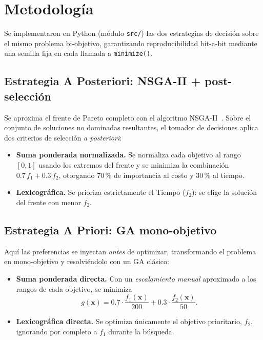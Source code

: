 \section{Metodología}

Se implementaron en Python (módulo \texttt{src/}) las dos estrategias de
decisión sobre el mismo problema bi-objetivo, garantizando reproducibilidad
bit-a-bit mediante una semilla fija en cada llamada a \texttt{minimize()}.

\subsection{Estrategia A Posteriori: NSGA-II + post-selección}

Se aproxima el frente de Pareto completo con el algoritmo
NSGA-II~\cite{deb2002nsga2,blank2020pymoo}. Sobre el conjunto de \MetNSol{}
soluciones no dominadas resultantes, el tomador de decisiones aplica dos
criterios de selección \emph{a posteriori}:

\begin{itemize}[noitemsep]
  \item \textbf{Suma ponderada normalizada.} Se normaliza cada objetivo al
        rango $[0,1]$ usando los extremos del frente y se minimiza la
        combinación $0.7\,\tilde{f_1} + 0.3\,\tilde{f_2}$, otorgando 70\,\% de
        importancia al costo y 30\,\% al tiempo.
  \item \textbf{Lexicográfica.} Se prioriza estrictamente el Tiempo ($f_2$):
        se elige la solución del frente con menor $f_2$.
\end{itemize}

\subsection{Estrategia A Priori: GA mono-objetivo}

Aquí las preferencias se inyectan \emph{antes} de optimizar, transformando el
problema en mono-objetivo y resolviéndolo con un GA clásico:

\begin{itemize}[noitemsep]
  \item \textbf{Suma ponderada directa.} Con un \emph{escalamiento manual}
        aproximado a los rangos de cada objetivo, se minimiza
        \[
          g(\mathbf{x}) = 0.7 \cdot \frac{f_1(\mathbf{x})}{200}
                        + 0.3 \cdot \frac{f_2(\mathbf{x})}{50}.
        \]
  \item \textbf{Lexicográfica directa.} Se optimiza únicamente el objetivo
        prioritario, $f_2$, ignorando por completo a $f_1$ durante la búsqueda.
\end{itemize}

